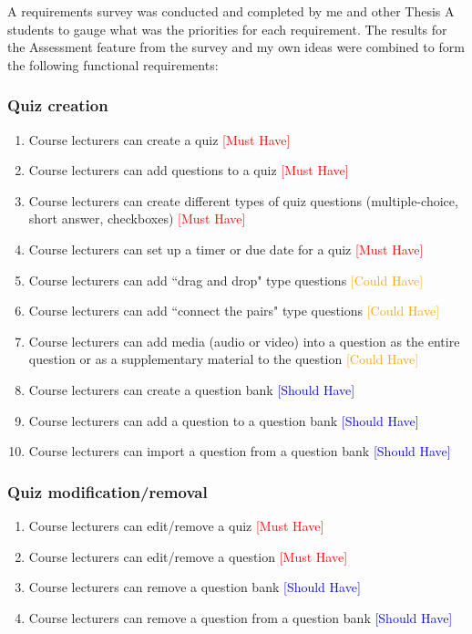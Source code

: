 A requirements survey was conducted and completed by me and other Thesis A students to gauge what was the priorities for each requirement. The results for the Assessment feature from the survey and my own ideas were combined to form the following functional requirements:

\subsubsection{Quiz creation}
\begin{enumerate}
	\item Course lecturers can create a quiz \textcolor{Red}{[Must Have]}
	\item Course lecturers can add questions to a quiz \textcolor{Red}{[Must Have]}
	\item Course lecturers can create different types of quiz questions (multiple-choice, short answer, checkboxes) \textcolor{Red}{[Must Have]}
	\item Course lecturers can set up a timer or due date for a quiz \textcolor{Red}{[Must Have]}
	\item Course lecturers can add ``drag and drop" type questions \textcolor{Orange}{[Could Have]}
	\item Course lecturers can add ``connect the pairs" type questions \textcolor{Orange}{[Could Have]}
	\item Course lecturers can add media (audio or  video) into a question as the entire question or as a supplementary material to the question \textcolor{Orange}{[Could Have]}
	\item Course lecturers can create a question bank \textcolor{Blue}{[Should Have]}
	\item Course lecturers can add a question to a question bank \textcolor{Blue}{[Should Have]}
	\item Course lecturers can import a question from a question bank \textcolor{Blue}{[Should Have]}
\end{enumerate}

\subsubsection{Quiz modification/removal}
\begin{enumerate}
	\item Course lecturers can edit/remove a quiz \textcolor{Red}{[Must Have]}
	\item Course lecturers can edit/remove a question \textcolor{Red}{[Must Have]}
	\item Course lecturers can remove a question bank \textcolor{Blue}{[Should Have]}
	\item Course lecturers can remove a question from a question bank \textcolor{Blue}{[Should Have]}
\end{enumerate}


